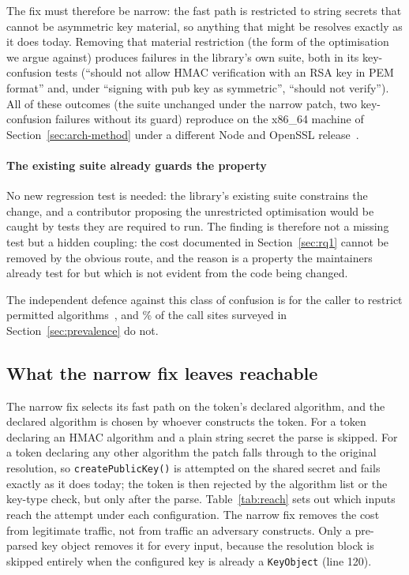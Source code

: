 \documentclass[preprint,12pt,authoryear]{elsarticle}
\newcommand{\NaiveFailingTests}{``should not allow HMAC verification with an RSA
key in PEM format'' and, under ``signing with pub key as symmetric'', ``should
not verify''}
\begin{document}
The fix must therefore be narrow: the fast path is restricted to string secrets
that cannot be asymmetric key material, so anything that might be resolves
exactly as it does today. Removing that material restriction (the form of the
optimisation we argue against) produces \SuiteNaiveFailing{} failures in the
library's own suite, both in its key-confusion tests
(\NaiveFailingTests). All of these outcomes (the suite unchanged under the
narrow patch, two key-confusion failures without its guard) reproduce on the
x86\_64 machine of Section~\ref{sec:arch-method} under a different Node and
OpenSSL release~\citep{artifact2026}.

\paragraph{The existing suite already guards the property} No new regression
test is needed: the library's existing suite constrains the change, and a
contributor proposing the unrestricted optimisation would be caught by tests
they are required to run. The finding is therefore not a missing test but a
hidden coupling: the cost documented in Section~\ref{sec:rq1} cannot be removed
by the obvious route, and the reason is a property the maintainers already test
for but which is not evident from the code being changed.

The independent defence against this class of confusion is for the caller to
restrict permitted algorithms~\citep{rfc8725}, and \SampleNoAlgorithmsPct\% of the
call sites surveyed in Section~\ref{sec:prevalence} do not.

\subsection{What the narrow fix leaves reachable}\label{sec:reachable}

The narrow fix selects its fast path on the token's declared algorithm, and
the declared algorithm is chosen by whoever constructs the token. For a token
declaring an HMAC algorithm and a plain string secret the parse is skipped.
For a token declaring any other algorithm the patch falls through to the
original resolution, so \texttt{createPublicKey()} is attempted on the shared
secret and fails exactly as it does today; the token is then rejected by the
algorithm list or the key-type check, but only after the parse.
Table~\ref{tab:reach} sets out which inputs reach the attempt under each
configuration. The narrow fix removes the cost from legitimate traffic, not
from traffic an adversary constructs. Only a pre-parsed key object removes it
for every input, because the resolution block is skipped entirely when the
configured key is already a \texttt{KeyObject} (line 120).
\end{document}
